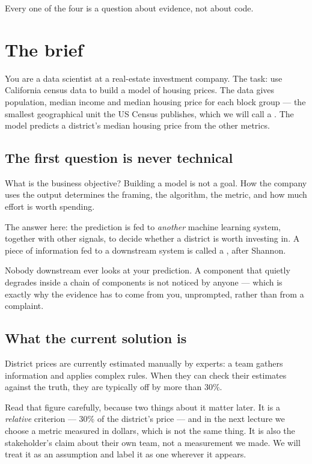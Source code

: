 \documentclass[11pt,a4paper]{article}
\begin{document}
Every one of the four is a question about evidence, not about code.

\section{The brief}

You are a data scientist at a real-estate investment company. The task: use
California census data to build a model of housing prices. The data gives
population, median income and median housing price for each block group --- the
smallest geographical unit the US Census publishes, which we will call a
. The model predicts a district's median housing price from the
other metrics.

\subsection{The first question is never technical}

What is the business objective? Building a model is not a goal. How the company
uses the output determines the framing, the algorithm, the metric, and how much
effort is worth spending.

The answer here: the prediction is fed to \emph{another} machine learning
system, together with other signals, to decide whether a district is worth
investing in. A piece of information fed to a downstream system is called a
, after Shannon.

\begin{keybox}[title={The consequence of being a component}]
Nobody downstream ever looks at your prediction. A component that quietly
degrades inside a chain of components is not noticed by anyone --- which is
exactly why the evidence has to come from you, unprompted, rather than from a
complaint.
\end{keybox}

\subsection{What the current solution is}

District prices are currently estimated manually by experts: a team gathers
information and applies complex rules. When they can check their estimates
against the truth, they are typically off by more than 30\%.

Read that figure carefully, because two things about it matter later. It is a
\emph{relative} criterion --- 30\% of the district's price --- and in the next
lecture we choose a metric measured in dollars, which is not the same thing. It
is also the stakeholder's claim about their own team, not a measurement we
made. We will treat it as an assumption and label it as one wherever it
appears.
\end{document}
